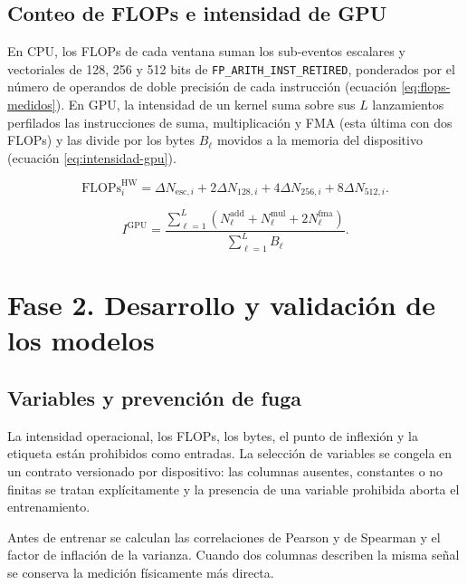 \subsection{Conteo de FLOPs e intensidad de GPU}

En CPU, los FLOPs de cada ventana suman los sub-eventos escalares y vectoriales de 128, 256 y 512 bits de \texttt{FP\_ARITH\_INST\_RETIRED}, ponderados por el número de operandos de doble precisión de cada instrucción (ecuación \eqref{eq:flops-medidos}). En GPU, la intensidad de un kernel suma sobre sus $L$ lanzamientos perfilados las instrucciones de suma, multiplicación y FMA (esta última con dos FLOPs) y las divide por los bytes $B_\ell$ movidos a la memoria del dispositivo (ecuación \eqref{eq:intensidad-gpu}).

\begin{equation}
\mathrm{FLOPs}_{i}^{\mathrm{HW}} =
\Delta N_{\mathrm{esc},i}+2\Delta N_{128,i}+4\Delta N_{256,i}+8\Delta N_{512,i}.
\label{eq:flops-medidos}
\end{equation}

\begin{equation}
I^{\mathrm{GPU}} =
\frac{\sum_{\ell=1}^{L}(N^{\mathrm{add}}_{\ell}+N^{\mathrm{mul}}_{\ell}+2N^{\mathrm{fma}}_{\ell})}{\sum_{\ell=1}^{L}B_{\ell}}.
\label{eq:intensidad-gpu}
\end{equation}

\section{Fase 2. Desarrollo y validación de los modelos}

\subsection{Variables y prevención de fuga}
\label{sec:contrato-features}

La intensidad operacional, los FLOPs, los bytes, el punto de inflexión y la etiqueta están prohibidos como entradas. La selección de variables se congela en un contrato versionado por dispositivo: las columnas ausentes, constantes o no finitas se tratan explícitamente y la presencia de una variable prohibida aborta el entrenamiento.

\label{sec:metodologia-correlacion-cpu}
Antes de entrenar se calculan las correlaciones de Pearson y de Spearman y el factor de inflación de la varianza. Cuando dos columnas describen la misma señal se conserva la medición físicamente más directa.

